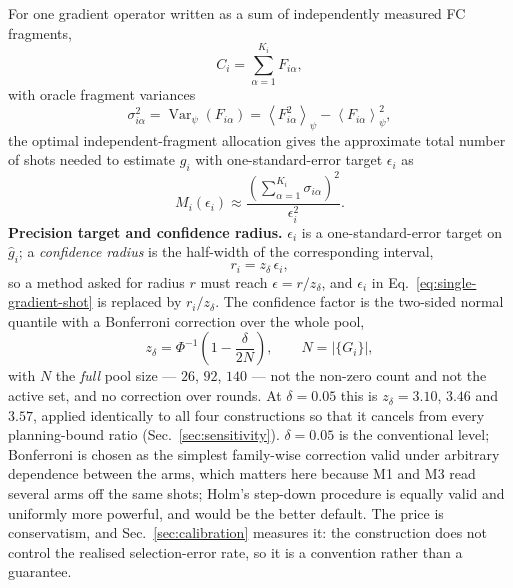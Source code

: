 \documentclass[10pt]{article}
\newcommand{\expect}[1]{\left\langle #1 \right\rangle}
\newcommand{\Var}{\operatorname{Var}}
\begin{document}
For one gradient operator written as a sum of independently measured FC fragments,
\begin{equation}
  C_i = \sum_{\alpha=1}^{K_i} F_{i\alpha},
\end{equation}
with oracle fragment variances
\begin{equation}
  \sigma^2_{i\alpha}=\Var_\psi(F_{i\alpha})
  =\expect{F_{i\alpha}^2}_\psi-\expect{F_{i\alpha}}_\psi^2,
\end{equation}
the optimal independent-fragment allocation gives the approximate total number of shots needed to estimate $g_i$ with one-standard-error target $\epsilon_i$ as
\begin{equation}
  M_i(\epsilon_i)\approx
  \frac{\left(\sum_{\alpha=1}^{K_i}\sigma_{i\alpha}\right)^2}{\epsilon_i^2} .
  \label{eq:single-gradient-shot}
\end{equation}
\textbf{Precision target and confidence radius.} $\epsilon_i$ is a one-standard-error target on $\widehat g_i$; a \emph{confidence radius} is the half-width of the corresponding interval,
\begin{equation}
  r_i=z_\delta\,\epsilon_i ,
  \label{eq:radius}
\end{equation}
so a method asked for radius $r$ must reach $\epsilon=r/z_\delta$, and $\epsilon_i$ in Eq.~\eqref{eq:single-gradient-shot} is replaced by $r_i/z_\delta$. The confidence factor is the two-sided normal quantile with a Bonferroni correction over the whole pool,
\begin{equation}
  z_\delta=\Phi^{-1}\!\left(1-\frac{\delta}{2N}\right),
  \qquad N=|\{G_i\}| ,
  \label{eq:zdelta}
\end{equation}
with $N$ the \emph{full} pool size --- $26$, $92$, $140$ --- not the non-zero count and not the active set, and no correction over rounds. At $\delta=0.05$ this is $z_\delta=3.10$, $3.46$ and $3.57$, applied identically to all four constructions so that it cancels from every planning-bound ratio (Sec.~\ref{sec:sensitivity}). $\delta=0.05$ is the conventional level; Bonferroni is chosen as the simplest family-wise correction valid under arbitrary dependence between the arms, which matters here because M1 and M3 read several arms off the same shots; Holm's step-down procedure is equally valid and uniformly more powerful, and would be the better default. The price is conservatism, and Sec.~\ref{sec:calibration} measures it: the construction does not control the realised selection-error rate, so it is a convention rather than a guarantee.
\end{document}
